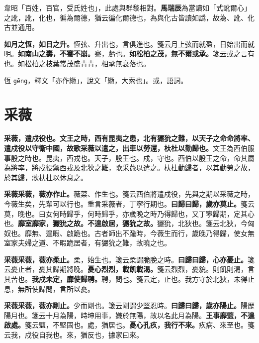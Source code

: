 \begin{quoting}韋昭「百姓，百官，受氏姓也」，此處與群黎相對。\textbf{馬瑞辰}為當讀如「式訛爾心」之訛，訛，化也，徧為爾德，猶云徧化爾德也，為與化古皆讀如譌，故為、訛、化古並通用。\end{quoting}

\textbf{如月之恆，如日之升。}{\footnotesize 恆弦、升出也，言俱進也。箋云月上弦而就盈，日始出而就明。}\textbf{如南山之壽，不騫不崩。}{\footnotesize 騫，虧也。}\textbf{如松柏之茂，無不爾或承。}{\footnotesize 箋云或之言有也。如松柏之枝葉常茂盛青青，相承無衰落也。}

\begin{quoting}恆 \texttt{gēng}，釋文「亦作緪」，說文「緪，大索也」。或，語詞。\end{quoting}

\section{采薇}


\textbf{采薇，遣戍役也。文王之時，西有昆夷之患，北有玁狁之難，以天子之命命將率、遣戍役以守衛中國，故歌采薇以遣之，出車以勞還，杕杜以勤歸也。}{\footnotesize 文王為西伯服事殷之時也。昆夷，西戎也。天子，殷王也。戍，守也。西伯以殷王之命，命其屬為將率，將戍役禦西戎及北狄之難，歌采薇以遣之。杕杜勤歸者，以其勤勞之故，於其歸，歌杕杜以休息之。}

\textbf{采薇采薇，薇亦作止。}{\footnotesize 薇菜、作生也。箋云西伯將遣戍役，先與之期以采薇之時，今薇生矣，先輩可以行也。重言采薇者，丁寧行期也。}\textbf{曰歸曰歸，歲亦莫止。}{\footnotesize 箋云莫，晚也。曰女何時歸乎，何時歸乎，亦歲晚之時乃得歸也，又丁寧歸期，定其心也。}\textbf{靡室靡家，玁狁之故。不遑啟居，玁狁之故。}{\footnotesize 玁狁，北狄也。箋云北狄，今匈奴也。靡無、遑暇、啟跪也。古者師出不踰時，今薇生而行，歲晚乃得歸，使女無室家夫婦之道、不暇跪居者，有玁狁之難，故曉之也。}

\textbf{采薇采薇，薇亦柔止。}{\footnotesize 柔，始生也。箋云柔謂脆脕之時。}\textbf{曰歸曰歸，心亦憂止。}{\footnotesize 箋云憂止者，憂其歸期將晚。}\textbf{憂心烈烈，載飢載渴。}{\footnotesize 箋云烈烈，憂貌。則飢則渴，言其苦也。}\textbf{我戍未定，靡使歸聘。}{\footnotesize 聘，問也。箋云定，止也。我方守於北狄，未得止息，無所使歸問，言所以憂。}

\textbf{采薇采薇，薇亦剛止。}{\footnotesize 少而剛也。箋云剛謂少堅忍時。}\textbf{曰歸曰歸，歲亦陽止。}{\footnotesize 陽歷陽月也。箋云十月為陽，時坤用事，嫌於無陽，故以名此月為陽。}\textbf{王事靡盬，不遑啟處。}{\footnotesize 箋云盬，不堅固也。處，猶居也。}\textbf{憂心孔疚，我行不來。}{\footnotesize 疚病、來至也。箋云我，戍役自我也。來，猶反也，據家曰來。}

